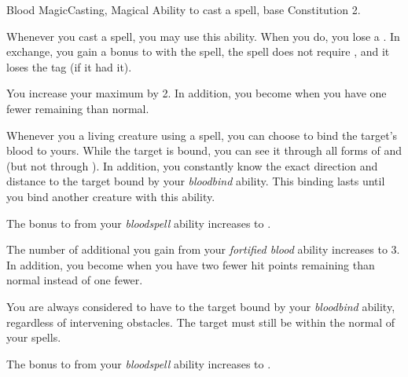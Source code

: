     \begin{feat}{Blood Magic}{Casting, Magical}
        \featpre Ability to cast a spell, base Constitution 2.

         Whenever you cast a spell, you may use this ability.
        When you do, you lose a .
        In exchange, you gain a  bonus to  with the spell, the spell does not require , and it loses the  tag (if it had it).

         You increase your maximum  by 2.
        In addition, you become  when you have one fewer  remaining than normal.

         Whenever you  a living creature using a spell, you can choose to bind the target's blood to yours.
        While the target is bound, you can see it through all forms of  and  (but not through ).
        In addition, you constantly know the exact direction and distance to the target bound by your \textit{bloodbind} ability.
        This binding lasts until you bind another creature with this ability.

         The bonus to  from your \textit{bloodspell} ability increases to .

         The number of additional  you gain from your \textit{fortified blood} ability increases to 3.
        In addition, you become  when you have two fewer hit points remaining than normal instead of one fewer.

         You are always considered to have  to the target bound by your \textit{bloodbind} ability, regardless of intervening obstacles.
        The target must still be within the normal  of your spells.

         The bonus to  from your \textit{bloodspell} ability increases to .
    \end{feat}

